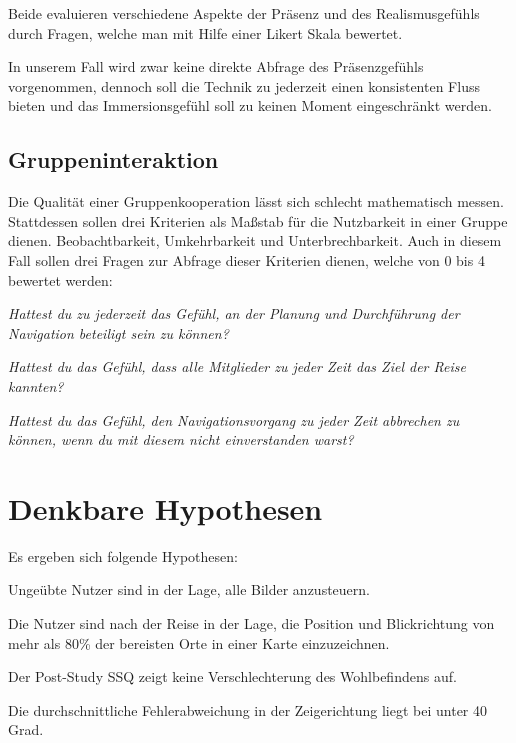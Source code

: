 Beide evaluieren verschiedene Aspekte der Präsenz und des Realismusgefühls durch Fragen, welche man mit Hilfe einer Likert Skala bewertet.

In unserem Fall wird zwar keine direkte Abfrage des Präsenzgefühls vorgenommen, dennoch soll die Technik zu jederzeit einen konsistenten Fluss bieten und das Immersionsgefühl soll zu keinen Moment eingeschränkt werden.

\subsection{Gruppeninteraktion}
Die Qualität einer Gruppenkooperation lässt sich schlecht mathematisch messen. 
Stattdessen sollen drei Kriterien als Maßstab für die Nutzbarkeit in einer Gruppe dienen.
Beobachtbarkeit, Umkehrbarkeit und Unterbrechbarkeit.
Auch in diesem Fall sollen drei Fragen zur Abfrage dieser Kriterien dienen, welche von 0 bis 4 bewertet werden:

\textit{Hattest du zu jederzeit das Gefühl, an der Planung und Durchführung der Navigation beteiligt sein zu können?}

\textit{Hattest du das Gefühl, dass alle Mitglieder zu jeder Zeit das Ziel der Reise kannten?}

\textit{Hattest du das Gefühl, den Navigationsvorgang zu jeder Zeit abbrechen zu können, wenn du mit diesem nicht einverstanden warst?}

\section{Denkbare Hypothesen}
Es ergeben sich folgende Hypothesen:

\begin{hypothesis}
\label{hyp:test}
Ungeübte Nutzer sind in der Lage, alle Bilder anzusteuern. 
\end{hypothesis}

\begin{hypothesis}
\label{hyp:test}
Die Nutzer sind nach der Reise in der Lage, die Position und Blickrichtung von mehr als 80\% der bereisten Orte in einer Karte einzuzeichnen.
\end{hypothesis}

\begin{hypothesis}
\label{hyp:test}
Der Post-Study SSQ zeigt keine Verschlechterung des Wohlbefindens auf.
\end{hypothesis}

\begin{hypothesis}
\label{hyp:test}
Die durchschnittliche Fehlerabweichung  in der Zeigerichtung liegt bei unter 40 Grad.
\end{hypothesis}

